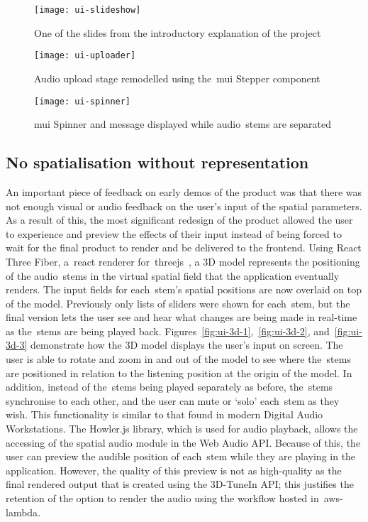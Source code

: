\begin{figure}[!htb]
    \minipage{\textwidth}
    \texttt{[image: ui-slideshow]}
    \caption{One of the slides from the introductory explanation of the project}\label{fig:ui-slideshow}
    \endminipage\hfill
\end{figure}

\begin{figure}[!htb]
    \minipage{\textwidth}
    \texttt{[image: ui-uploader]}
    \caption{Audio upload stage remodelled using the~\gls{mui} Stepper component}\label{fig:ui-uploader}
    \endminipage\hfill
\end{figure}

\begin{figure}[!htb]
    \minipage{\textwidth}
    \texttt{[image: ui-spinner]}
    \caption{\gls{mui} Spinner and message displayed while audio~\glspl{stem} are separated}\label{fig:ui-spinner}
    \endminipage
\end{figure}

\subsection{No spatialisation without representation}\label{subsec:no-spatialisation-without-representation}
An important piece of feedback on early demos of the product was that there was not enough visual or audio feedback on the user's input of the spatial parameters.
As a result of this,
the most significant redesign of the product allowed the user
to experience and preview the effects of their input
instead of being forced to wait for the final product to render and be delivered to the frontend.
Using React Three Fiber, a~\gls{react} renderer for~\gls{threejs}~\citep{dirksen2023learn},
a 3D model represents the positioning of the audio~\glspl{stem} in the virtual spatial field
that the application eventually renders.
The input fields for each~\gls{stem}'s spatial positions are now overlaid on top of the model.
Previously only lists of sliders were shown for each~\gls{stem},
but the final version lets
the user see and hear what changes are being made in real-time as the~\glspl{stem} are being played back.
Figures~\ref{fig:ui-3d-1},~\ref{fig:ui-3d-2},
and~\ref{fig:ui-3d-3} demonstrate how the 3D model displays the user's input on screen.
The user is able
to rotate and zoom in and out of the model
to see where the~\glspl{stem} are positioned in relation to the listening position at the origin of the model.
In addition, instead of the~\glspl{stem} being played separately as before, the~\glspl{stem} synchronise to each other,
and the user can mute or `solo' each~\gls{stem} as they wish.
This functionality is similar to that found in modern Digital Audio Workstations.
The Howler.js library,
which is used for audio playback, allows the accessing of the spatial audio module in the Web Audio API\@.
Because of this, the user can preview the audible position of each~\gls{stem} while they are playing in the application.
However,
the quality of this preview is not as high-quality as the final rendered output that is created using the 3D-TuneIn API\@;
this justifies the retention of the option to render the audio using the workflow hosted in~\gls{aws-lambda}.

